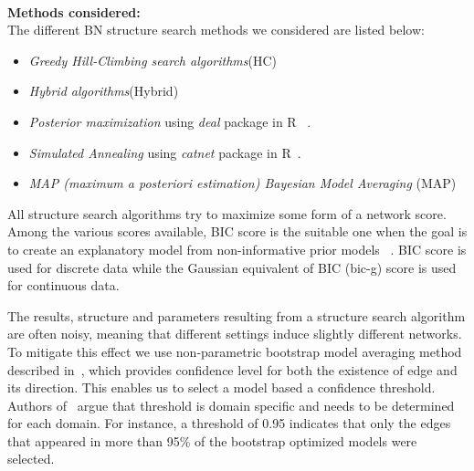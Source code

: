 \documentclass[smallextended]{svjour3}       %
\begin{document}
\noindent\\
\textbf{Methods considered:}\\
The different BN structure search methods we considered are listed below:

\begin{itemize}
\item \textit{Greedy Hill-Climbing search algorithms}(HC)~\cite{nagarajan2013bayesian,bnppt}
\item \textit{Hybrid algorithms}(Hybrid)~\cite{nagarajan2013bayesian,bnppt}
\item \textit{Posterior maximization} using \textit{deal} package in R~\cite{bnppt,dealR} .
\item \textit{Simulated Annealing} using \textit{catnet} package in R~\cite{catnetR,bnppt}.
\item \textit{MAP (maximum a posteriori estimation) Bayesian Model Averaging} (MAP) ~\cite{nagarajan2013bayesian,bnppt}
\end{itemize}

All structure search algorithms try to maximize some form of a network score. 
Among the various scores available, BIC score is the suitable one when 
the goal is to create an explanatory model from non-informative prior models
~\cite{shmueli2010explain,sober2002instrumentalism}.
BIC score is used for discrete data while the Gaussian 
equivalent of BIC (bic-g) score is used for continuous data.

The results, structure and parameters resulting from a structure
search algorithm are often noisy, meaning that
different settings induce slightly different networks. To mitigate
this effect we use non-parametric bootstrap model averaging method
described in~\cite{friedman1999data}, which provides confidence
level for both the existence of edge and its direction. This enables
us to select a model based a confidence threshold. Authors
of~\cite{friedman1999data} argue that threshold is domain specific
and needs to be determined for each domain. For instance, a threshold of 
 0.95 indicates that  only the edges that appeared in more than
 95\% of the bootstrap optimized models were selected. 
 
\end{document}
